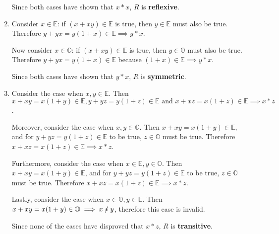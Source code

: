 \documentclass[12pt]{article}
\newcommand{\nir}{\mathrel{\mathrlap{/}*}}
\newenvironment{ps}
{\begin{enumerate}[leftmargin=0em, itemindent=1.5em]}
{\end{enumerate}}
\begin{document}
\begin{ps}
\begin{enumerate}[label=\arabic*.]
                Since both cases have shown that \( x*x\), \( R \) is \textbf{reflexive}.

            \item Consider \( x \in \mathbb{E} \): if \( (x+xy) \in \mathbb{E} \) is true, then \( y
                \in \mathbb{E} \) must also be true. Therefore \( y + yx = y(1+x) \in \mathbb{E}
                \implies y*x \). 

                Now consider \( x \in \mathbb{O} \): if \( (x+xy) \in \mathbb{E} \) is true, then \(
                y \in \mathbb{O} \) must also be true. Therefore \( y+yx = y(1+x) \in \mathbb{E} \)
                because \( (1+x) \in \mathbb{E} \implies y*x \). 

                Since both cases have shown that \( y*x \), \( R \) is \textbf{symmetric}.
            
            \item Consider the case when \( x, y \in \mathbb{E} \). Then \( x+xy = x(1+y) \in
                \mathbb{E}, y+yz = y(1+z) \in \mathbb{E} \text{ and } x + xz = x(1 + z) \in \mathbb{E} \implies
                x*z \).

                Moreover, consider the case when \( x, y \in \mathbb{O} \). Then \( x+xy = x(1+y) \in
                \mathbb{E} \), and for \( y+yz = y(1+z) \in \mathbb{E} \) to be true, \( z \in
                \mathbb{O} \) must be true. Therefore \( x+xz=x(1+z) \in \mathbb{E} \implies x*z \).

                Furthermore, consider the case when \( x \in \mathbb{E}, y \in \mathbb{O} \). Then
                \( x+xy = x(1+y) \in \mathbb{E} \), and for \( y+yz = y(1+z) \in \mathbb{E} \) to be
                true, \( z \in \mathbb{O} \) must be true. Therefore \( x+xz = x(1+z) \in \mathbb{E}
                \implies x*z \).

                Lastly, consider the case when \( x \in \mathbb{O}, y \in \mathbb{E} \). Then
                \( x+xy = x(1+y) \in \mathbb{O} \implies x \nir y\), therefore this case is invalid.

                Since none of the cases have disproved that \( x*z \), \( R \) is
                \textbf{transitive}.

        \end{enumerate}

\end{ps}
\end{document}
